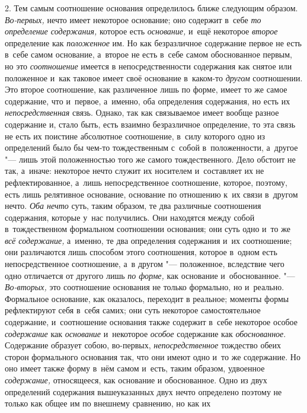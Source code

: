 2. Тем самым соотношение основания определилось ближе следующим образом.
{\em Во-первых,} нечто имеет некоторое основание; оно
содержит в~себе {\em то определение содержания,}
которое есть {\em основание,} и~ещё некоторое
{\em второе} определение как
{\em положенное} им. Но как безразличное содержание
первое не есть в~себе самом основание, а~второе не есть в~себе самом
обоснованное первым, но это {\em соотношение} имеется в
непосредственности содержания как снятое или положенное и~как таковое имеет
своё основание в~каком-то {\em другом} соотношении. Это
второе соотношение, как различенное лишь по форме, имеет то же самое
содержание, что и~первое, а~именно, оба определения содержания, но есть их
{\em непосредственная} связь. Однако, так как
связываемое имеет вообще разное содержание и, стало быть, есть взаимно
безразличное определение, то эта связь не есть их поистине абсолютное
соотношение, в~силу которого одно из определений было бы чем-то
тождественным с~собой в~положенности, а~другое "--- лишь этой положенностью
того же самого тождественного. Дело обстоит не так, а~иначе: некоторое
нечто служит их носителем и~составляет их не рефлектированное, а~лишь
непосредственное соотношение, которое, поэтому, есть лишь релятивное
основание, основание по отношению к~их связи в~другом нечто.
{\em Оба нечто} суть, таким образом, те два различные
соотношения содержания, которые у~нас получились. Они находятся между собой
в~тождественном формальном соотношении основания; они суть одно и~то же
{\em всё содержание,} а~именно, те два определения
содержания и~их соотношение; они различаются лишь способом этого
соотношения, которое в~одном есть непосредственное соотношение, а~в другом
"--- положенное, вследствие чего одно отличается от другого лишь
{\em по форме,} как основание и~обоснованное. "---
{\em Во-вторых,} это соотношение основания не только
формально, но и~реально. Формальное основание, как оказалось, переходит в
реальное; моменты формы рефлектируют себя в~себя самих; они суть некоторое
самостоятельное содержание, и~соотношение основания также содержит в~себе
некоторое особое {\em содержание} как {\em основание} и~некоторое
{\em особое} содержание как {\em обоснованное}. Содержание образует собою,
во-первых, {\em непосредственное} тождество обеих
сторон формального основания так, что они имеют одно и~то же содержание. Но
оно имеет также форму в~нём самом и~есть, таким образом, удвоенное
{\em содержание,} относящееся, как основание и
обоснованное. Одно из двух определений содержания вышеуказанных двух нечто
определено поэтому не только как общее им по внешнему сравнению, но как их
